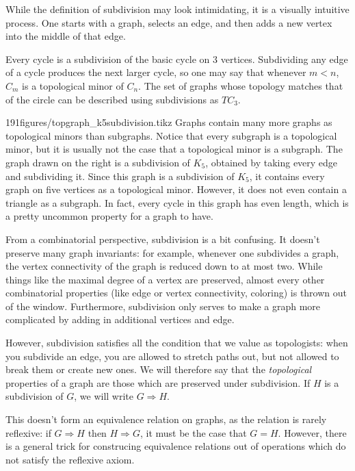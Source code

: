 While the definition of subdivision may look intimidating, it is a visually intuitive process.
One starts with a graph, selects an edge, and then adds a new vertex into the middle of that edge. 

Every cycle is a subdivision of the basic cycle on 3 vertices. Subdividing any edge of a cycle produces the next larger cycle, so one may say that whenever $m<n$, $C_m$ is a topological minor of $C_n$. The set of graphs whose topology matches that of the circle can be described using subdivisions as $TC_3$. 

\begin{examplefigureenv}[$K_5$ Subdivision]{191figures/topgraph_k5subdivision.tikz}
Graphs contain many more graphs as topological minors than subgraphs.
Notice that every subgraph is a topological minor, but it is usually not the case that a topological minor is a subgraph.
The graph drawn on the right is a subdivision of $K_5$, obtained by taking every edge and subdividing it.
Since this graph is a subdivision of $K_5$, it contains every graph on five vertices as a topological minor.
However, it does not even contain a triangle as a subgraph. 
In fact, every cycle in this graph has even length, which is a pretty uncommon property for a graph to have. 
\end{examplefigureenv}

From a combinatorial perspective, subdivision is a bit confusing.
It doesn't preserve many graph invariants: for example, whenever one subdivides a graph, the vertex connectivity of the graph is reduced down to at most two. 
While things like the maximal degree of a vertex are preserved, almost every other combinatorial properties (like edge or vertex connectivity, coloring) is thrown out of the window. Furthermore, subdivision only serves to make a graph more complicated by adding in additional vertices and edge. 

However, subdivision satisfies all the condition that we value as topologists: when you subdivide an edge, you are allowed to stretch paths out, but  not allowed to break them or create new ones. We will therefore say that the \emph{topological} properties of a graph are those which are preserved under subdivision.
If $H$ is a subdivision of $G$, we will write $G\Rightarrow H$. 

This doesn't form an equivalence relation on graphs, as the relation is rarely reflexive: if $G\Rightarrow H$ then $H\Rightarrow G$, it must be the case that $G=H$. 
However, there is a general trick for construcing equivalence relations out of operations which do not satisfy the reflexive axiom. 

